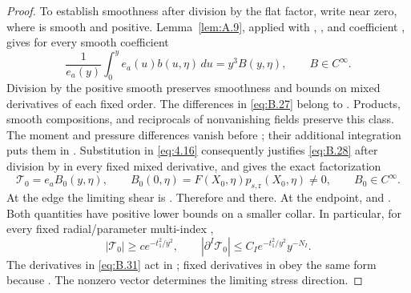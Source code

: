 \begin{proof}
To establish smoothness after division by the flat factor, write
 near zero, where
 is smooth and positive. Lemma~\ref{lem:A.9}, applied with
, , and coefficient
, gives for every smooth coefficient 
\[
  \frac{1}{e_a(y)}\int_0^y e_a(u)b(u,\eta)\,du
  =y^3B(y,\eta),
  \qquad B\in C^\infty.
\]
Division by the positive smooth  preserves smoothness and bounds on mixed derivatives
of each fixed order. The differences in \eqref{eq:B.27} belong to
. Products, smooth compositions, and reciprocals of nonvanishing fields preserve this class. The moment and
pressure differences vanish before ; their additional integration puts them in
. Substitution in \eqref{eq:4.16} consequently justifies \eqref{eq:B.28}
after division by  in every fixed mixed derivative, and gives the exact factorization
\begin{equation}
  \mathcal T_0=e_aB_0(y,\eta),
  \qquad
  B_0(0,\eta)=F(X_0,\eta)p_{s,\mathrm r}(X_0,\eta)\neq0,
  \qquad
  B_0\in C^\infty.
\tag{B.30}\label{eq:B.30}
\end{equation}
%
At the edge the limiting shear is . Therefore
 and  there. At
the endpoint,  and
. Both quantities
have positive lower bounds on a smaller collar. In particular, for every fixed radial/parameter
multi-index ,
\begin{equation}
  |\mathcal T_0|\geq ce^{-t_1^2/y^2},
  \qquad
  |\partial^I\mathcal T_0|\leq C_Ie^{-t_1^2/y^2}y^{-N_I}.
\tag{B.31}\label{eq:B.31}
\end{equation}
The derivatives in \eqref{eq:B.31} act in ; fixed derivatives in
 obey the same form because . The nonzero vector
 determines the limiting stress direction.


\end{proof}
